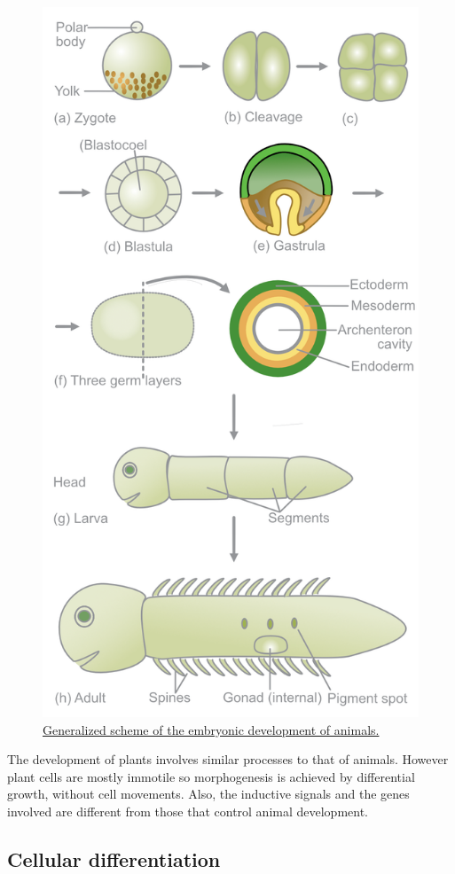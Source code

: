 \begin{figure}

{\centering \includegraphics[width=0.7\linewidth]{./figures/development/Slack_Essential_Dev_Biol_Fig_02-08} 

}

\caption{\href{https://commons.wikimedia.org/wiki/File:Slack_Essential_Dev_Biol_Fig_02-08.jpg}{Generalized scheme of the embryonic development of animals.}}\label{fig:generaldevelopmentscheme}
\end{figure}

The development of plants involves similar processes to that of animals. However plant cells are mostly immotile so morphogenesis is achieved by differential growth, without cell movements. Also, the inductive signals and the genes involved are different from those that control animal development.

\hypertarget{cellular-differentiation}{%
\subsection{Cellular differentiation}\label{cellular-differentiation}}

